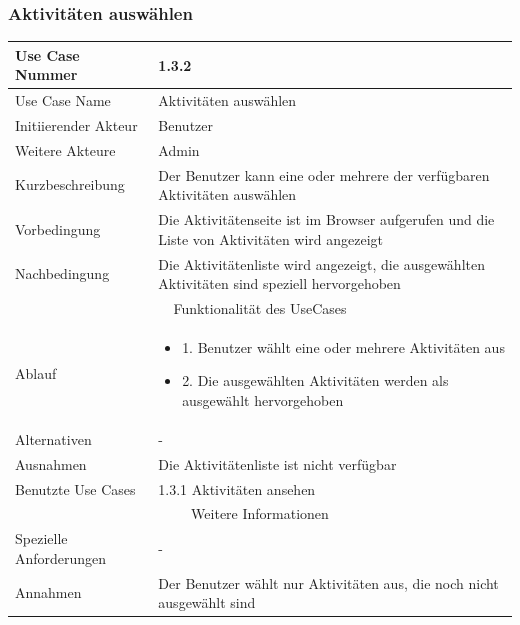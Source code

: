 \documentclass[10pt,a4paper]{article}
\begin{document}
	\subsubsection{Aktivit\"aten ausw\"ahlen}
	\begin{tabular}{|l|p{.5\linewidth}|}
	\hline Use Case Nummer & 1.3.2 \\ 
	\hline Use Case Name & Aktivit\"aten ausw\"ahlen \\ 
	\hline Initiierender Akteur & Benutzer \\
	\hline Weitere Akteure & Admin \\
	\hline Kurzbeschreibung & Der Benutzer kann eine oder mehrere der verf\"ugbaren Aktivit\"aten ausw\"ahlen \\
	\hline Vorbedingung & Die Aktivit\"atenseite ist im Browser aufgerufen und die Liste von Aktivit\"aten wird angezeigt \\
	\hline Nachbedingung & Die Aktivit\"atenliste wird angezeigt, die ausgew\"ahlten Aktivit\"aten sind speziell hervorgehoben \\
	\hline \multicolumn{2}{|c|}{Funktionalität des UseCases}\\
	\hline Ablauf & \begin{itemize}
			\item 1. Benutzer w\"ahlt eine oder mehrere Aktivit\"aten aus
			\item 2. Die ausgew\"ahlten Aktivit\"aten werden als ausgew\"ahlt hervorgehoben
		\end{itemize} \\
	\hline Alternativen & - \\
	\hline Ausnahmen & Die Aktivit\"atenliste ist nicht verf\"ugbar \\
	\hline Benutzte Use Cases & 1.3.1 Aktivit\"aten ansehen \\
	\hline \multicolumn{2}{|c|}{Weitere Informationen} \\
	\hline Spezielle Anforderungen & - \\
	\hline Annahmen & Der Benutzer w\"ahlt nur Aktivit\"aten aus, die noch nicht ausgew\"ahlt sind \\
	\hline
	\end{tabular}
\end{document}
